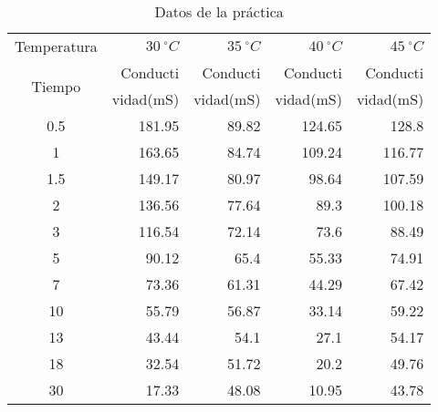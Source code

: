 \begin{table}[H]
    \centering
    \begin{tabular}{crrrr}
        \hline
        \multicolumn{1}{l}{Temperatura} & $30 \:^{ \circ} C$    & $35\: ^{ \circ} C$    & $40\:^{ \circ} C$    & $45\: ^{ \circ}C$ \\
        \multicolumn{1}{c}{\multirow{2}[0]{*}{Tiempo}} & \multicolumn{1}{p{4.335em}}{Conducti} & \multicolumn{1}{p{4.445em}}{Conducti} & \multicolumn{1}{p{4.28em}}{Conducti} & \multicolumn{1}{p{3.945em}}{Conducti} \\
              & \multicolumn{1}{p{4.335em}}{vidad(mS)} & \multicolumn{1}{p{4.445em}}{vidad(mS)} & \multicolumn{1}{p{4.28em}}{vidad(mS)} & \multicolumn{1}{p{3.945em}}{vidad(mS)} \\ \hline
        0.5   & 181.95 & 89.82 & 124.65 & 128.8  \\
        1     & 163.65 & 84.74 & 109.24 & 116.77 \\
        1.5   & 149.17 & 80.97 & 98.64  & 107.59 \\
        2     & 136.56 & 77.64 & 89.3   & 100.18 \\
        3     & 116.54 & 72.14 & 73.6   & 88.49  \\
        5     & 90.12  & 65.4  & 55.33  & 74.91  \\
        7     & 73.36  & 61.31 & 44.29  & 67.42  \\
        10    & 55.79  & 56.87 & 33.14  & 59.22  \\
        13    & 43.44  & 54.1  & 27.1   & 54.17  \\
        18    & 32.54  & 51.72 & 20.2   & 49.76  \\
        30    & 17.33  & 48.08 & 10.95  & 43.78  \\ 
        \hline
    \end{tabular}
    \caption{Datos de la práctica}
    \label{tab:addlabel}
\end{table}
  